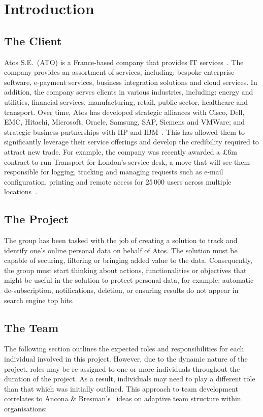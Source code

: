 \section{Introduction}

\subsection{The Client}

Atos S.E.~(ATO) is a France-based company that provides IT services~\parencite{web:reuters}. The company provides an assortment of services, including: bespoke enterprise software, e-payment services, business integration solutions and cloud services. In addition, the company serves clients in various industries, including: energy and utilities, financial services, manufacturing, retail, public sector, healthcare and transport. Over time, Atos has developed strategic alliances with Cisco, Dell, EMC, Hitachi, Microsoft, Oracle, Samsung, SAP, Siemens and VMWare; and strategic business partnerships with HP and IBM~\parencite{web:bloomberg}. This has allowed them to significantly leverage their service offerings and develop the credibility required to attract new trade. For example, the company was recently awarded a \pounds 6m contract to run Transport for London's service desk, a move that will see them responsible for logging, tracking and managing requests such as e-mail configuration, printing and remote access for 25\,000 users across multiple locations~\parencite{web:jee}.

\subsection{The Project}

The group has been tasked with the job of creating a solution to track and identify one’s online personal data on behalf of Atos. The solution must be capable of securing, filtering or bringing added value to the data. Consequently, the group must start thinking about actions, functionalities or objectives that might be useful in the solution to protect personal data, for example: automatic de-subscription, notifications, deletion, or ensuring results do not appear in search engine top hits.

\subsection{The Team}

The following section outlines the expected roles and responsibilities for each individual involved in this project. However, due to the dynamic nature of the project, roles may be re-assigned to one or more individuals throughout the duration of the project. As a result, individuals may need to play a different role than that which was initially outlined. This approach to team development correlates to Ancona \& Bresman's~\parencite{book:xteams} ideas on adaptive team structure within organisations:

